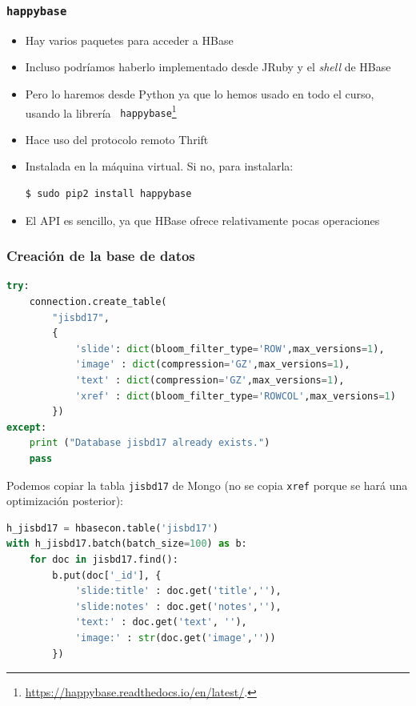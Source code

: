 \documentclass[14pt]{beamer}
\begin{document}
\begin{frame}
\begin{itemize}
\begin{frame}[fragile]
  \frametitle{{\tt happybase}}
  \begin{itemize}
\item Hay varios paquetes para acceder a HBase
\item Incluso podríamos haberlo implementado desde JRuby y el {\em shell\/}
  de HBase
\item Pero lo haremos desde Python ya que lo hemos usado en todo el curso,
  usando la librería {\tt
    happybase}\footnote{\url{https://happybase.readthedocs.io/en/latest/}.}
\item Hace uso del protocolo remoto Thrift
\item Instalada en la máquina virtual. Si no, para instalarla:
\begin{lstlisting}[language=bash]
$ sudo pip2 install happybase
\end{lstlisting}
\item El API es sencillo, ya que HBase ofrece relativamente pocas
  operaciones
\end{itemize}
\end{frame}

\begin{frame}
  \frametitle{Creación de la base de datos}
\begin{lstlisting}[language=python]
try:
    connection.create_table(
        "jisbd17",
        {
            'slide': dict(bloom_filter_type='ROW',max_versions=1),
            'image' : dict(compression='GZ',max_versions=1),
            'text' : dict(compression='GZ',max_versions=1),
            'xref' : dict(bloom_filter_type='ROWCOL',max_versions=1)
        })
except:
    print ("Database jisbd17 already exists.")
    pass
\end{lstlisting}

  \framebreak

Podemos copiar la tabla {\tt jisbd17} de Mongo (no se copia {\tt xref}
porque se hará una optimización posterior):

\begin{lstlisting}[language=python]
h_jisbd17 = hbasecon.table('jisbd17')
with h_jisbd17.batch(batch_size=100) as b:
    for doc in jisbd17.find():
        b.put(doc['_id'], {
            'slide:title' : doc.get('title',''),
            'slide:notes' : doc.get('notes',''),
            'text:' : doc.get('text', ''),
            'image:' : str(doc.get('image',''))
        })
\end{lstlisting}


\end{frame}
\end{itemize}
\end{frame}
\end{document}
